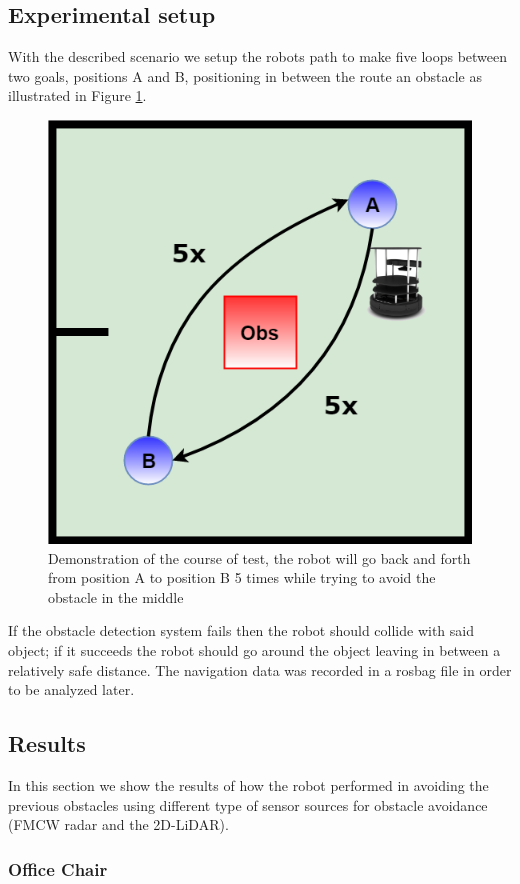 \subsection{Experimental setup}
With the described scenario we setup the robots path to make five loops between two goals, positions A and B, positioning in between the route an obstacle as illustrated in  Figure \ref{fig:exp}. 
\begin{figure}[ht!]
\centerline{\includegraphics [width=0.5 \textwidth]{imgs/chapter5/exp.png}}
\caption[Demonstration of the course of test]{Demonstration of the course of test, the robot will go back and forth from position A to position B 5 times while  trying to avoid the obstacle in the middle}
\label{fig:exp}
\end{figure}

If the obstacle detection system fails then the robot should collide with said object; if it succeeds the robot should go around the object leaving in between a relatively safe distance. 
The  navigation data was recorded in a rosbag file in order to be analyzed later.



\subsection{Results}
In this section we show the results of how the robot performed in avoiding the previous obstacles using different type of sensor sources for obstacle avoidance (\ac{FMCW} radar and the 2D-\ac{LiDAR}).

\subsubsection{Office Chair}


